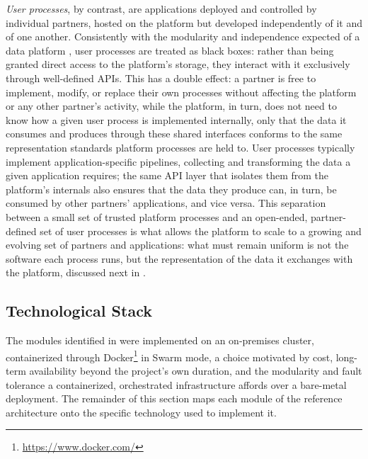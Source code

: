 \emph{User processes}, by contrast, are applications deployed and controlled by individual partners, hosted on the platform but developed independently of it and of one another. Consistently with the modularity and independence expected of a data platform \cite{francia2025process}, user processes are treated as black boxes: rather than being granted direct access to the platform's storage, they interact with it exclusively through well-defined APIs. This has a double effect: a partner is free to implement, modify, or replace their own processes without affecting the platform or any other partner's activity, while the platform, in turn, does not need to know how a given user process is implemented internally, only that the data it consumes and produces through these shared interfaces conforms to the same representation standards platform processes are held to. User processes typically implement application-specific pipelines, collecting and transforming the data a given application requires; the same API layer that isolates them from the platform's internals also ensures that the data they produce can, in turn, be consumed by other partners' applications, and vice versa.
This separation between a small set of trusted platform processes and an open-ended, partner-defined set of user processes is what allows the platform to scale to a growing and evolving set of partners and applications: what must remain uniform is not the software each process runs, but the representation of the data it exchanges with the platform, discussed next in .

\subsection{Technological Stack}
\label{sec:dataplat-implementation}

The modules identified in  were implemented on an on-premises cluster, containerized through Docker\footnote{\url{https://www.docker.com/}} in Swarm mode, a choice motivated by cost, long-term availability beyond the project's own duration, and the modularity and fault tolerance a containerized, orchestrated infrastructure affords over a bare-metal deployment. The remainder of this section maps each module of the reference architecture onto the specific technology used to implement it.

